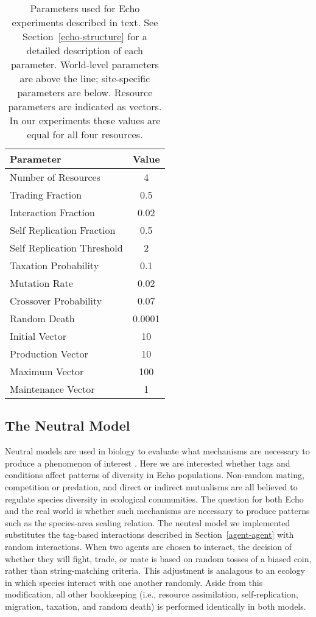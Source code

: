 \begin{table}[t!]
\begin{center}
\begin{tabular}{|l|c|} \hline
Parameter & Value \\ \hline
Number of Resources & 4 \\
Trading Fraction & 0.5 \\
Interaction Fraction & 0.02 \\
Self Replication Fraction & 0.5\\
Self Replication Threshold & 2\\
Taxation Probability & 0.1 \\ \hline
Mutation Rate & 0.02 \\
Crossover Probability & 0.07 \\
Random Death & 0.0001 \\
Initial Vector & 10 \\
Production Vector & 10 \\
Maximum Vector & 100 \\
Maintenance Vector & 1 \\ \hline
\end{tabular}
\end{center}
\caption{Parameters used for Echo experiments described in text.  See
Section~\protect\ref{echo-structure} for a detailed description of each
parameter.  World-level parameters are above the line; site-specific 
parameters are below.  Resource parameters are indicated as vectors.  
In our experiments these values are equal for all four resources.
\label{tab:simulation-parameters}}
\end{table}

\subsection{The Neutral Model}
\label{neutral-model}

Neutral models are used in biology to evaluate what mechanisms are
necessary to produce a phenomenon of interest
\cite{Caswell76,NiteckiAndHoffman87}.  Here we are interested whether
tags and conditions affect patterns of diversity in Echo populations.
Non-random mating, competition or predation, and direct or indirect
mutualisms are all believed to regulate species diversity in
ecological communities.  The question for both Echo and the real world
is whether such mechanisms are 
necessary to produce patterns such as the species-area scaling
relation.  The neutral model we implemented substitutes the tag-based
interactions described in Section~\ref{agent-agent} with random
interactions.  When two agents are chosen to interact, the decision of
whether they will fight, trade, or mate is based on random tosses of a
biased coin, rather than string-matching criteria.  This adjustment 
is analagous to an ecology in which species interact with one another
randomly.  Aside from this modification, all other bookkeeping (i.e.,
resource assimilation, self-replication, migration, taxation, and
random death) is performed identically in both models.

